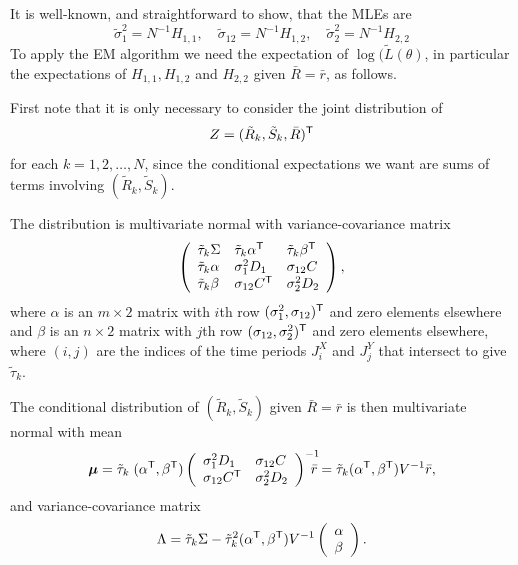  
It is well-known, and straightforward to show, that the MLEs are
$$\tilde{\sigma}_1^2 = N^{-1} H_{1,1}, \quad \tilde{\sigma}_{12} = N^{-1} H_{1,2},\quad \tilde{\sigma}^2_2 = N^{-1} H_{2,2}$$ 
To apply the EM algorithm we need the expectation of $\log(\tilde{L}(\theta)$, in particular the expectations of $H_{1,1},H_{1,2}$ and $H_{2,2}$ given $\bar{R}=\bar{r}$, as follows.

First note that it is only necessary to consider the joint distribution of 
$$Z=(\tilde{R}_k,\tilde{S}_k,\bar{R})^{\sf T}$$ for each $k = 1,2,\dots,N$, since the conditional expectations we want are sums of terms involving $(\tilde{R}_k,\tilde{S}_k)$.

The distribution is multivariate normal with variance-covariance matrix
$$\left(\begin{array}{lll} \tilde{\tau}_k\Sigma & \tilde{\tau}_k\alpha^{\sf T} & \tilde{\tau}_k\beta^{\sf T} \\
                                          \tilde{\tau}_k\alpha & \sigma^2_1 D_1 & \sigma_{12} C \\              
                                          \tilde{\tau}_k\beta & \sigma_{12} C^{\sf T} & \sigma^2_2 D_2
\end{array}\right),
$$                                                            
where $\alpha$ is an $m \times 2$ matrix with $i$th row $(\sigma^2_1,\sigma_{12})^{\sf T}$ and zero elements elsewhere and $\beta$ is an $n \times 2$ matrix with $j$th row $(\sigma_{12},\sigma^2_2)^{\sf T}$ and zero elements elsewhere,  
where $(i,j)$ are the indices of the time periods $J^X_i$ and $J^Y_j$ that intersect to give $\tilde{\tau}_k$.  

The conditional distribution of $(\tilde{R}_k,\tilde{S}_k)$ given $\bar{R}=\bar{r}$ is then multivariate normal with mean 
$$\boldsymbol{\mu} = \tilde{\tau}_k\;(\alpha^{\sf T},\beta^{\sf T})\left(\begin{array}{ll} \sigma^2_1 D_1 & \sigma_{12} C \\ \sigma_{12} C^{\sf T} & \sigma^2_2 D_2 \end{array} \right)^{-1} \!\!\!\!\!\bar{r}  = 
\tilde{\tau}_k(\alpha^{\sf T},\beta^{\sf T}) V^{-1} \bar{r}, $$
and variance-covariance matrix
$$\Lambda = \tilde{\tau}_k \Sigma - \tilde{\tau}^2_k(\alpha^{\sf T},\beta^{\sf T}) V^{-1} \left(\begin{array}{l}\alpha\\ \beta \end{array}\right).$$  

